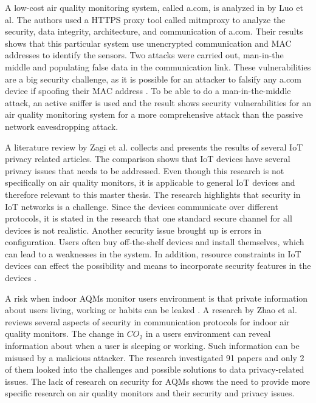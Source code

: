 A low-cost air quality monitoring system, called a.com, is analyzed in \cite{SecurityAndDataIntInAQM} by Luo et al. The authors used a \gls{HTTPS} proxy tool called mitmproxy to analyze the security, data integrity, architecture, and communication of a.com. Their results shows that this particular system use unencrypted communication and \gls{MAC} addresses to identify the sensors. Two attacks were carried out, man-in-the middle and populating false data in the communication link. These vulnerabilities are a big security challenge, as it is possible for an attacker to falsify any a.com device if spoofing their \gls{MAC} address \cite{SecurityAndDataIntInAQM}. To be able to do a man-in-the-middle attack, an active sniffer is used and the result shows security vulnerabilities for an air quality monitoring system for a more comprehensive attack than the passive network eavesdropping attack. 

A literature review by Zagi et al. \cite{PrivacyOnGeneralIoT} collects and presents the results of several \gls{IoT} privacy related articles. The comparison shows that \gls{IoT} devices have several privacy issues that needs to be addressed. Even though this research is not specifically on air quality monitors, it is applicable to general \gls{IoT} devices and therefore relevant to this master thesis. The research highlights that security in \gls{IoT} networks is a challenge. Since the devices communicate over different protocols, it is stated in the research that one standard secure channel for all devices is not realistic. Another security issue brought up is errors in configuration. Users often buy off-the-shelf devices and install themselves, which can lead to a weaknesses in the system. In addition, resource constraints in \gls{IoT} devices can effect the possibility and means to incorporate security features in the devices \cite{PrivacyOnGeneralIoT}. 

A risk when indoor \gls{AQM}s monitor users environment is that private information about users living, working or habits can be leaked \cite{IAQMonitorCommunicationReview}. A research by Zhao et al. \cite{IAQMonitorCommunicationReview} reviews several aspects of security in communication protocols for indoor air quality monitors. The change in \(CO_2\) in a users environment can reveal information about when a user is sleeping or working. Such information can be misused by a malicious attacker. The research investigated 91 papers and only 2 of them looked into the challenges and possible solutions to data privacy-related issues. The lack of research on security for \gls{AQM}s shows the need to provide more specific research on air quality monitors and their security and privacy issues. 

